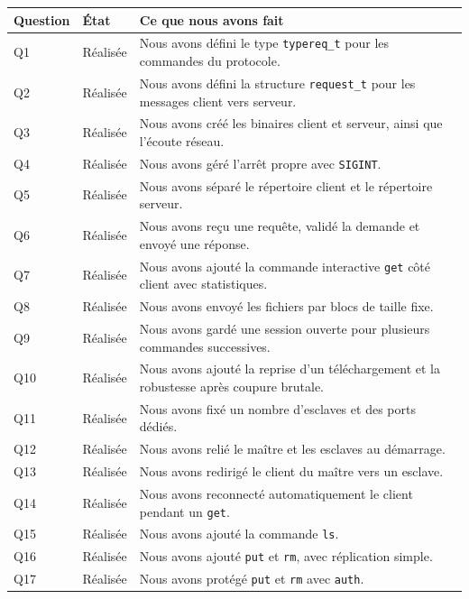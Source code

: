 \documentclass[a4paper,11pt]{article}
\begin{document}
\begin{center}
\small
\begin{tabularx}{\textwidth}{@{}L{0.09\textwidth}L{0.16\textwidth}L{0.67\textwidth}@{}}
\toprule
\textbf{Question} & \textbf{État} & \textbf{Ce que nous avons fait} \\
\midrule
Q1 & Réalisée & Nous avons défini le type \texttt{typereq\_t} pour les commandes du protocole. \\
Q2 & Réalisée & Nous avons défini la structure \texttt{request\_t} pour les messages client vers serveur. \\
Q3 & Réalisée & Nous avons créé les binaires client et serveur, ainsi que l'écoute réseau. \\
Q4 & Réalisée & Nous avons géré l'arrêt propre avec \texttt{SIGINT}. \\
Q5 & Réalisée & Nous avons séparé le répertoire client et le répertoire serveur. \\
Q6 & Réalisée & Nous avons reçu une requête, validé la demande et envoyé une réponse. \\
Q7 & Réalisée & Nous avons ajouté la commande interactive \texttt{get} côté client avec statistiques. \\
Q8 & Réalisée & Nous avons envoyé les fichiers par blocs de taille fixe. \\
Q9 & Réalisée & Nous avons gardé une session ouverte pour plusieurs commandes successives. \\
Q10 & Réalisée & Nous avons ajouté la reprise d'un téléchargement et la robustesse après coupure brutale. \\
Q11 & Réalisée & Nous avons fixé un nombre d'esclaves et des ports dédiés. \\
Q12 & Réalisée & Nous avons relié le maître et les esclaves au démarrage. \\
Q13 & Réalisée & Nous avons redirigé le client du maître vers un esclave. \\
Q14 & Réalisée & Nous avons reconnecté automatiquement le client pendant un \texttt{get}. \\
Q15 & Réalisée & Nous avons ajouté la commande \texttt{ls}. \\
Q16 & Réalisée & Nous avons ajouté \texttt{put} et \texttt{rm}, avec réplication simple. \\
Q17 & Réalisée & Nous avons protégé \texttt{put} et \texttt{rm} avec \texttt{auth}. \\
\bottomrule
\end{tabularx}
\end{center}
\end{document}
